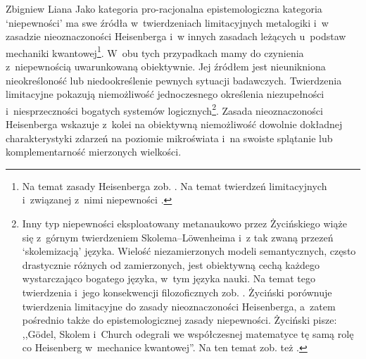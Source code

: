 \begin{artplenv}{Zbigniew Liana}
\enlargethispage{-\baselineskip}
Jako kategoria pro-racjonalna epistemologiczna kategoria ‘niepewności' ma swe źródła w~twierdzeniach limitacyjnych metalogiki i~w zasadzie nieoznaczoności Heisenberga i~w innych zasadach leżących u~podstaw mechaniki kwantowej\footnote{Na temat zasady Heisenberga zob.
\parencites[][s.~158n]{zycinski_teizm_1985}[][s.~138nn]{zycinski_structure_1988}[][s.~246n]{zycinski_struktura_2013_liana}. %
 Na temat twierdzeń limitacyjnych i~związanej z~nimi niepewności  
\parencites[zob.][s.~158]{zycinski_teizm_1985}[][s.~18–46]{zycinski_teizm_1988}[][s.~102–113]{zycinski_structure_1988}[][s.~183–201]{zycinski_struktura_2013_liana}[][s.~262–276]{zycinski_elementy_1996}[][s.~355–374]{zycinski_elementy_2015}.
}.
W~obu tych przypadkach mamy do czynienia z~niepewnością uwarunkowaną obiektywnie. Jej źródłem jest nieunikniona nieokreśloność lub niedookreślenie pewnych sytuacji badawczych. Twierdzenia limitacyjne pokazują niemożliwość jednoczesnego określenia niezupełności i~niesprzeczności bogatych systemów logicznych\footnote{Inny typ niepewności eksploatowany metanaukowo przez Życińskiego wiąże się z~górnym twierdzeniem Skolema–Löwenheima i~z tak zwaną przezeń ‘skolemizacją' języka. Wielość niezamierzonych modeli semantycznych, często drastycznie różnych od zamierzonych, jest obiektywną cechą każdego wystarczająco bogatego języka, w~tym języka nauki. Na temat tego twierdzenia i~jego konsekwencji filozoficznych zob.
\parencites[][s.~22–46]{zycinski_structure_1988}[][s.~270–276]{zycinski_elementy_1996}[][s.~369–373]{zycinski_elementy_2015}. %
 Życiński porównuje twierdzenia limitacyjne do zasady nieoznaczoności Heisenberga, a~zatem pośrednio także do epistemologicznej zasady niepewności. Życiński 
\parencites*[][s.~109]{zycinski_structure_1988}[][s.~194]{zycinski_struktura_2013_liana} %
 pisze: ,,Gödel, Skolem i~Church odegrali we współczesnej matematyce tę samą rolę co Heisenberg w~mechanice kwantowej''. Na ten temat zob. też 
\parencites[][s.~273]{zycinski_elementy_1996}[][s.~371]{zycinski_elementy_2015}.%
}. Zasada nieoznaczoności Hei\-senberga wskazuje z~kolei na obiektywną niemożliwość dowolnie dokładnej charakterystyki zdarzeń na poziomie mikroświata i~na swoiste splątanie lub komplementarność mierzonych wielkości.


\end{artplenv}
